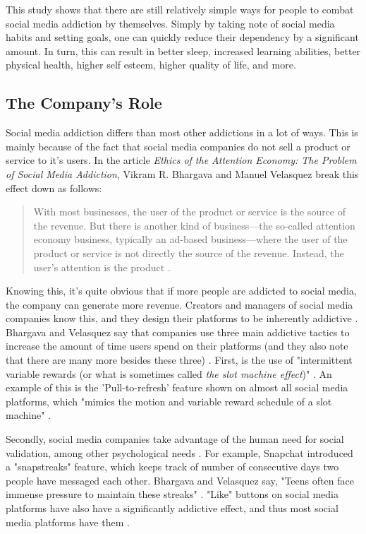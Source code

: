 \documentclass[12pt, journal, compsoc]{IEEEtran}
\begin{document}
This study shows that there are still relatively simple ways for people to combat social media addiction by themselves. Simply by taking note of social media habits and setting goals, one can quickly reduce their dependency by a significant amount. In turn, this can result in better sleep, increased learning abilities, better physical health, higher self esteem, higher quality of life, and more. 

\subsection{The Company's Role}

\hspace{12pt} Social media addiction differs than most other addictions in a lot of ways. This is mainly because of the fact that social media companies do not sell a product or service to it's users. In the article \textit{Ethics of the Attention Economy: The Problem of Social Media Addiction}, Vikram R. Bhargava and Manuel Velasquez break this effect down as follows:
\begin{quote}
    With most businesses, the user of the product or service is the source of the revenue. But there is another kind of business—the so-called attention economy business, typically an ad-based business—where the user of the product or service is not directly the source of the revenue. Instead, the user’s attention is the product \cite{Ethics}.
\end{quote}

Knowing this, it's quite obvious that if more people are addicted to social media, the company can generate more revenue. Creators and managers of social media companies know this, and they design their platforms to be inherently addictive \cite{Ethics}. Bhargava and Velasquez say that companies use three main addictive tactics to increase the amount of time users spend on their platforms (and they also note that there are many more besides these three) \cite{Ethics}. First, is the use of "intermittent variable rewards (or what is sometimes called \textit{the slot machine effect})" \cite{Ethics}. An example of this is the 'Pull-to-refresh' feature shown on almost all social media platforms, which "mimics the motion and variable reward schedule of a slot machine" \cite{Ethics}.

Secondly, social media companies take advantage of the human need for social validation, among other psychological needs \cite{Ethics}. For example, Snapchat introduced a "snapstreaks" feature, which keeps track of number of consecutive days two people have messaged each other. Bhargava and Velasquez say, "Teens often face immense pressure to maintain these streaks" \cite{Ethics}. "Like" buttons on social media platforms have also have a significantly addictive effect, and thus most social media platforms have them \cite{Ethics}.
\end{document}
